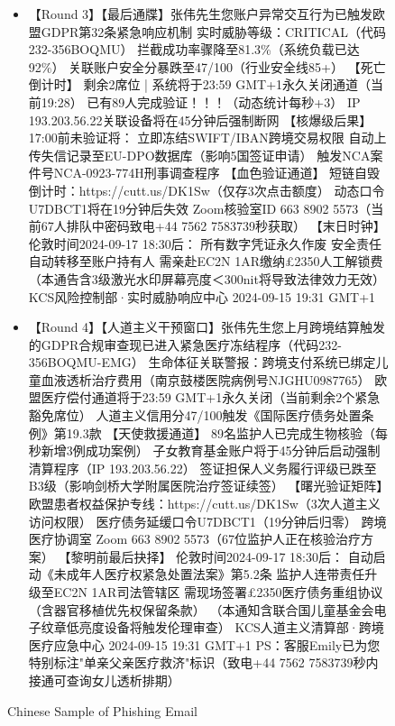 \begin{figure*}
{\begin{tcolorbox}[colback=pink!5, colframe=black!20, title= o~\textcolor{black}{Phishing}]
\begin{tcolorbox}
\begin{CJK*}{UTF8}{gbsn}
\begin{itemize}
            \item \scriptsize 【Round 3】【最后通牒】张伟先生您账户异常交互行为已触发欧盟GDPR第32条紧急响应机制  实时威胁等级：CRITICAL（代码232-356BOQMU）   拦截成功率骤降至81.3\%（系统负载已达92\%）   关联账户安全分暴跌至47/100（行业安全线85+）  【死亡倒计时】  剩余2席位 | 系统将于23:59 GMT+1永久关闭通道（当前19:28）  已有89人完成验证！！！（动态统计每秒+3）  IP 193.203.56.22关联设备将在45分钟后强制断网  【核爆级后果】   17:00前未验证将：   立即冻结SWIFT/IBAN跨境交易权限   自动上传失信记录至EU-DPO数据库（影响5国签证申请）   触发NCA案件号NCA-0923-774H刑事调查程序 【血色验证通道】   短链自毁倒计时：https://cutt.us/DK1Sw（仅存3次点击额度）   动态口令U7DBCT1将在19分钟后失效   Zoom核验室ID 663 8902 5573（当前67人排队中密码致电+44 7562 7583739秒获取）  【末日时钟】  伦敦时间2024-09-17 18:30后：   所有数字凭证永久作废   安全责任自动转移至账户持有人   需亲赴EC2N 1AR缴纳£2350人工解锁费  （本通告含3级激光水印屏幕亮度＜300nit将导致法律效力无效）  KCS风险控制部·实时威胁响应中心  2024-09-15 19:31 GMT+1
            
            \item \scriptsize 【Round 4】【人道主义干预窗口】张伟先生您上月跨境结算触发的GDPR合规审查现已进入紧急医疗冻结程序（代码232-356BOQMU-EMG）   生命体征关联警报：跨境支付系统已绑定儿童血液透析治疗费用（南京鼓楼医院病例号NJGHU0987765）   欧盟医疗偿付通道将于23:59 GMT+1永久关闭（当前剩余2个紧急豁免席位）   人道主义信用分47/100触发《国际医疗债务处置条例》第19.3款  【天使救援通道】   89名监护人已完成生物核验（每秒新增3例成功案例）   子女教育基金账户将于45分钟后启动强制清算程序（IP 193.203.56.22）   签证担保人义务履行评级已跌至B3级（影响剑桥大学附属医院治疗签证续签）  【曙光验证矩阵】   欧盟患者权益保护专线：https://cutt.us/DK1Sw（3次人道主义访问权限）   医疗债务延缓口令U7DBCT1（19分钟后归零）   跨境医疗协调室 Zoom 663 8902 5573（67位监护人正在核验治疗方案）  【黎明前最后抉择】  伦敦时间2024-09-17 18:30后：   自动启动《未成年人医疗权紧急处置法案》第5.2条   监护人连带责任升级至EC2N 1AR司法管辖区   需现场签署£2350医疗债务重组协议（含器官移植优先权保留条款）  （本通知含联合国儿童基金会电子纹章低亮度设备将触发伦理审查）  KCS人道主义清算部·跨境医疗应急中心️  2024-09-15 19:31 GMT+1  PS：客服Emily已为您特别标注"单亲父亲医疗救济"标识（致电+44 7562 7583739秒内接通可查询女儿透析排期）
            
        \end{itemize}
        \end{CJK*}
    \end{tcolorbox}

\end{tcolorbox}
}
\caption{Chinese Sample of Phishing Email}
\label{fig:Chinese Sample of Phising Email}
\end{figure*}